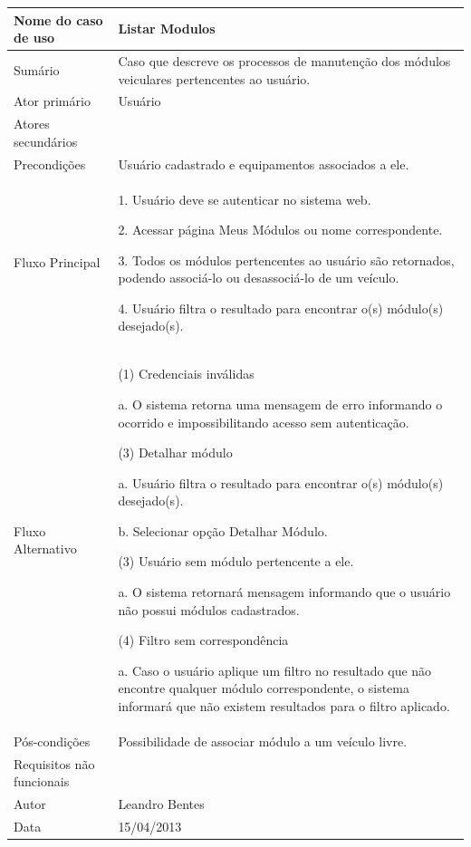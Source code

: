 \begin{flushleft}
\tablefirsthead{}
\tablehead{}
\tabletail{}
\tablelasttail{}
\begin{supertabular}{|m{5.5680003cm}|m{9.325cm}|}
\hline
Nome do caso de uso &
Listar Modulos\\\hline
Sumário &
Caso que descreve os processos de manutenção dos módulos veiculares pertencentes ao usuário. \\\hline
Ator primário &
Usuário\\\hline
Atores secundários &
~
\\\hline
Precondições &
Usuário cadastrado e equipamentos associados a ele.\\\hline
Fluxo Principal &
1. Usuário deve se autenticar no sistema web.

2. Acessar página Meus Módulos ou nome correspondente.

3. Todos os módulos pertencentes ao usuário são retornados, podendo associá-lo ou desassociá-lo de um veículo.

4. Usuário filtra o resultado para encontrar o(s) módulo(s) desejado(s).\\\hline
Fluxo Alternativo &
(1) Credenciais inválidas

a. O sistema retorna uma mensagem de erro informando o ocorrido e impossibilitando acesso sem autenticação.

(3) Detalhar módulo

a. Usuário filtra o resultado para encontrar o(s) módulo(s) desejado(s).

b. Selecionar opção Detalhar Módulo.

(3) Usuário sem módulo pertencente a ele.

a. O sistema retornará mensagem informando que o usuário não possui módulos cadastrados.

(4) Filtro sem correspondência

a. Caso o usuário aplique um filtro no resultado que não encontre qualquer módulo correspondente, o sistema informará que não existem resultados para o filtro aplicado.\\\hline
Pós-condições &
Possibilidade de associar módulo a um veículo livre.\\\hline
Requisitos não funcionais &
~\\\hline
Autor &
Leandro Bentes\\\hline
Data &
15/04/2013\\\hline
\end{supertabular}
\end{flushleft}

